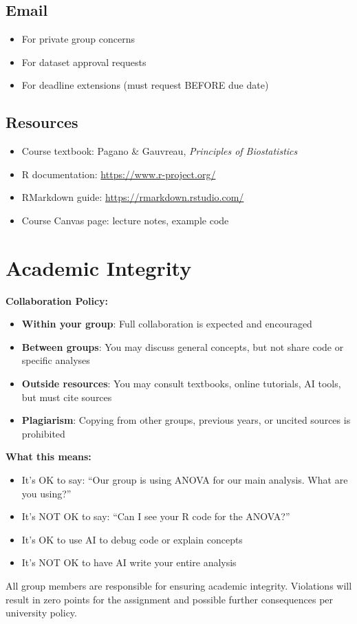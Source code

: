 \documentclass[11pt]{article}
\begin{document}
\subsection*{Email}
\begin{itemize}
\item For private group concerns
\item For dataset approval requests
\item For deadline extensions (must request BEFORE due date)
\end{itemize}

\subsection*{Resources}
\begin{itemize}
\item Course textbook: Pagano \& Gauvreau, \textit{Principles of Biostatistics}
\item R documentation: \url{https://www.r-project.org/}
\item RMarkdown guide: \url{https://rmarkdown.rstudio.com/}
\item Course Canvas page: lecture notes, example code
\end{itemize}

\section*{Academic Integrity}

\begin{tcolorbox}[colback=gray!10,colframe=black,boxrule=1pt]
\textbf{Collaboration Policy:}

\begin{itemize}
\item \textbf{Within your group}: Full collaboration is expected and encouraged
\item \textbf{Between groups}: You may discuss general concepts, but not share code or specific analyses
\item \textbf{Outside resources}: You may consult textbooks, online tutorials, AI tools, but must cite sources
\item \textbf{Plagiarism}: Copying from other groups, previous years, or uncited sources is prohibited
\end{itemize}

\textbf{What this means:}
\begin{itemize}
\item It's OK to say: ``Our group is using ANOVA for our main analysis. What are you using?''
\item It's NOT OK to say: ``Can I see your R code for the ANOVA?''
\item It's OK to use AI to debug code or explain concepts
\item It's NOT OK to have AI write your entire analysis
\end{itemize}

All group members are responsible for ensuring academic integrity. Violations will result in zero points for the assignment and possible further consequences per university policy.
\end{tcolorbox}
\end{document}
